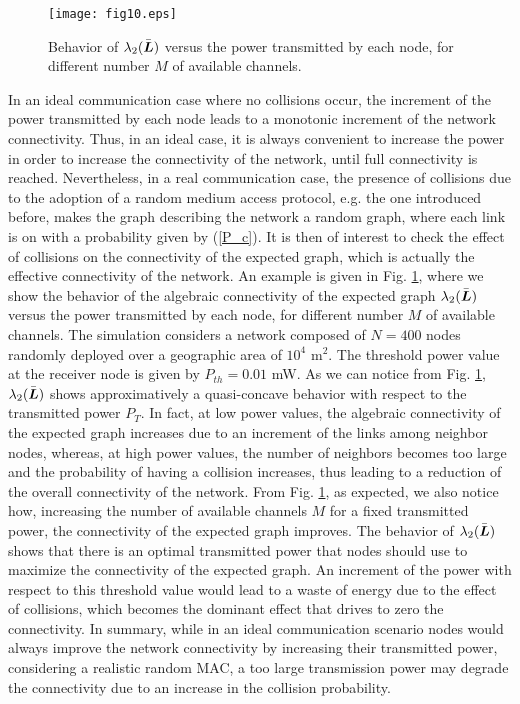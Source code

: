 \documentclass[10pt,twocolumn]{IEEEtran}
\def\bL{\mbox{\boldmath $L$}}
\begin{document}
\begin{figure}[t]
\centering
\texttt{[image: fig10.eps]}
  \caption{Behavior of $\lambda_2(\bar{\bL})$ versus the power transmitted by each node, for different number $M$ of available channels.}\label{mean_lambda_power}
\end{figure}
In an ideal communication case where no collisions occur, the increment of the power transmitted by each node leads to a monotonic increment of the network connectivity.
Thus, in an ideal case, it is always convenient to increase the power in order to increase the connectivity of the network, until full connectivity is reached. Nevertheless, in a real communication case, the presence of collisions due to the adoption of a random medium access protocol, e.g. the one introduced before, makes the graph describing the network a random graph, where each link is on with a probability given by (\ref{P_c}). It is then of interest to check the effect of collisions on the connectivity of the expected graph, which is actually the effective connectivity of the network. An example is given in Fig. \ref{mean_lambda_power}, where we show the behavior of the algebraic connectivity of the expected graph $\lambda_2(\bar{\bL})$ versus the power transmitted by each node, for different number $M$ of available channels. The simulation considers a network composed of $N=400$ nodes randomly deployed over a geographic area of $10^4$ m$^2$. The threshold power value at the receiver node is given by $P_{th}=0.01$ mW.
As we can notice from Fig. \ref{mean_lambda_power}, $\lambda_2(\bar{\bL})$ shows approximatively a quasi-concave behavior with respect to the transmitted power $P_T$. In fact, at low power values, the algebraic connectivity of the expected graph increases due to an increment of the links among neighbor nodes, whereas, at high power values, the number of neighbors becomes too large and the probability of having a collision increases, thus leading to a reduction of the overall connectivity of the network. From Fig. \ref{mean_lambda_power}, as expected, we also notice how, increasing the number of available channels $M$ for a fixed transmitted power, the connectivity of the expected graph improves. The behavior of $\lambda_2(\bar{\bL})$ shows that there is an optimal transmitted power that nodes should use to maximize the connectivity of the expected graph. An increment of the power with respect to this threshold value would lead to a waste of energy due to the effect of collisions, which becomes the dominant effect that drives to zero the connectivity. In summary, while in an ideal communication scenario nodes would always improve the network connectivity by increasing their transmitted power, considering a realistic random MAC, a too large transmission power may degrade the connectivity due to an increase in the collision probability.
\end{document}
